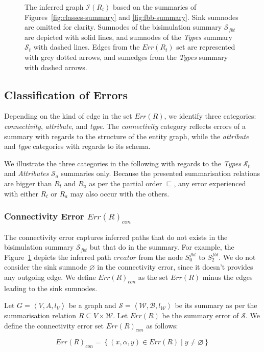 \begin{figure}
	\centering
	\resizebox{\textwidth}{!}{
		
	}
	\caption{The inferred graph $\mathcal{I}(R_t)$ based on the summaries of Figures~\ref{fig:classes-summary} and \ref{fig:fbb-summary}.
	Sink sumnodes are omitted for clarity. Sumnodes of the bisimulation summary $\mathcal{S}_{fbt}$ are depicted with solid lines, and sumnodes of the \emph{Types} summary $\mathcal{S}_t$ with dashed lines. Edges from the $Err(R_t)$ set are represented with grey dotted arrows, and sumedges from the \emph{Types} summary with dashed arrows.}
	\label{fig:accuracy}
\end{figure}

\subsection{Classification of Errors}
\label{sec:error-classification}

Depending on the kind of edge in the set $Err(R)$, we identify three categories: \emph{connectivity}, \emph{attribute}, and \emph{type}. The \emph{connectivity} category reflects errors of a summary with regards to the structure of the entity graph, while the \emph{attribute} and \emph{type} categories with regards to its schema.

We illustrate the three categories in the following with regards to the \emph{Types} $\mathcal{S}_t$ and \emph{Attributes} $\mathcal{S}_a$ summaries only. Because the presented summarisation relations are bigger than $R_t$ and $R_a$ as per the partial order $\sqsubseteq$, any error experienced with either $R_t$ or $R_a$ may also occur with the others.

\subsubsection{Connectivity Error $Err(R)_{con}$}

The connectivity error captures inferred paths that do not exists in the bisimulation summary $\mathcal{S}_{fbt}$ but that do in the summary. For example, the Figure~\ref{fig:accuracy} depicts the inferred path $creator$ from the node $S^{fbt}_0$ to $S^{fbt}_2$.
We do not consider the sink sumnode $\varnothing$ in the connectivity error, since it doesn't provides any outgoing edge. We define $Err(R)_{con}$ as the set $Err(R)$ minus the edges leading to the sink sumnodes.

\begin{definition}
Let $G=\left\langle V, A, l_V \right\rangle$ be a graph and $\mathcal{S} = \left\langle \mathcal{W}, \mathcal{B}, l_{\mathcal{W}} \right\rangle$ be its summary as per the summarisation relation $R \subseteq V \times \mathcal{W}$. Let $Err(R)$ be the summary error of $\mathcal{S}$. We define the connectivity error set $Err(R)_{con}$ as follows:

$$
Err(R)_{con} = \left\lbrace (x, \alpha, y) \in Err(R) \mid y \neq \varnothing \right\rbrace
$$
\end{definition}


